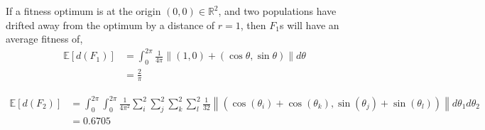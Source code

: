 \documentclass{article}
\newcommand{\R}{\mathbb{R}}
\newcommand{\1}{\mathbbm{1}}
\begin{document}
If a fitness optimum is at the origin $(0,0) \in \R^{2}$,
and two populations have drifted away from the optimum by a distance of $r=1$,
then $F_1$s will have an average fitness of,
  \begin{align*}
    \mathbb{E} \left[ d(F_1) \right] &= \int_{0}^{2\pi} \frac{1}{4 \pi} \left\lVert (1,0) + (\cos\theta,\sin\theta) \right\rVert d\theta \\
    &= \frac{2}{\pi}
  \end{align*}

  \begin{align*}
    \mathbb{E} \left[ d(F_2) \right] &= \int_{0}^{2 \pi} \int_{0}^{2 \pi} \frac{1}{4 \pi^{2}} \sum_{i}^{2} \sum_{j}^{2} \sum_{k}^{2} \sum_{l}^{2} \frac{1}{32} \left\lVert \left( \cos(\theta_i) + \cos(\theta_k), \sin(\theta_j) + \sin(\theta_l) \right) \right\rVert d\theta_1 d\theta_2 \\ &= 0.6705
  \end{align*}
\end{document}
